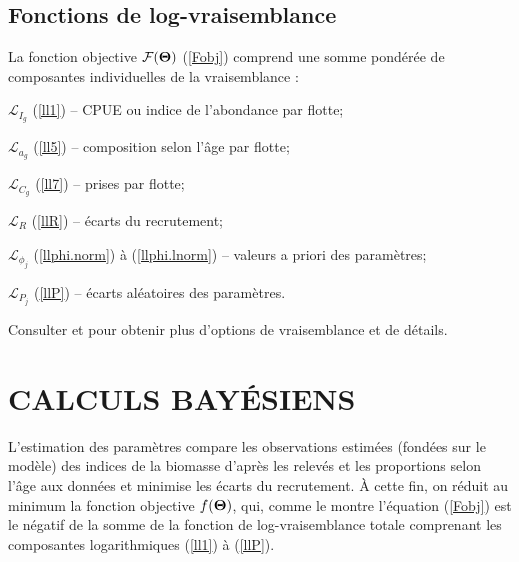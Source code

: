 \documentclass[11pt]{book}
\newcommand{\Lagr}{\mathcal{L}}%
\newcommand{\Fobj}{\mathcal{F}}%
\def\bfTh{{\bf \Theta}}%
\def\bfTh{{\bf \Theta}}          %
\newcommand{\eref}[1]{(\ref{#1})}
\begin{document}
\subsection{Fonctions de log-vraisemblance}

La fonction objective $\Fobj(\bfTh)$ \eref{Fobj} comprend une somme pond\'{e}r\'{e}e de composantes individuelles de la vraisemblance :
\begin{itemize_csas}{}{}
  \item $\Lagr_{I_g}$ \eref{ll1} -- CPUE ou indice de l'abondance par flotte;
  \item $\Lagr_{a_g}$ \eref{ll5} -- composition selon l'\^{a}ge par flotte;
  \item $\Lagr_{C_g}$ \eref{ll7} -- prises par flotte;
  \item $\Lagr_{R}$ \eref{llR}   -- \'{e}carts du recrutement;
  \item $\Lagr_{\phi_j}$ \eref{llphi.norm} \`{a} \eref{llphi.lnorm} -- valeurs a priori des param\`{e}tres;
  \item $\Lagr_{P_j}$ \eref{llP} -- \'{e}carts al\'{e}atoires des param\`{e}tres.
\end{itemize_csas}
Consulter \citet{Methot-Wetzel:2013} et \citet{Methot-etal:2021} pour obtenir plus d'options de vraisemblance et de d\'{e}tails.

\section{CALCULS BAY\'{E}SIENS}

L'estimation des param\`{e}tres compare les observations estim\'{e}es (fond\'{e}es sur le mod\`{e}le) des indices de la biomasse d'apr\`{e}s les relev\'{e}s et les proportions selon l'\^{a}ge aux donn\'{e}es et minimise les \'{e}carts du recrutement. \`{A} cette fin, on r\'{e}duit au minimum la fonction objective $f(\bfTh)$, qui, comme le montre l'\'{e}quation \eref{Fobj} est le n\'{e}gatif de la somme de la fonction de log-vraisemblance totale comprenant les composantes logarithmiques \eref{ll1} \`{a} \eref{llP}.
\end{document}
